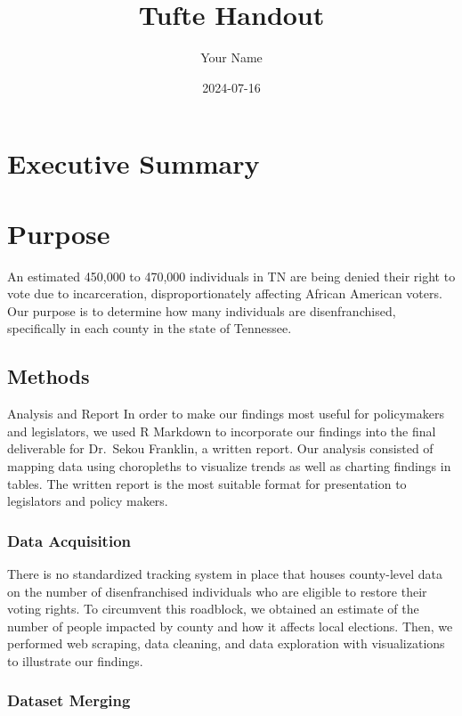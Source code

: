 \documentclass[12pt,]{tufte-handout}
\title{Tufte Handout}
\author{Your Name}
\date{2024-07-16}
\begin{document}
\maketitle




\section{Executive Summary}\label{executive-summary}

\section{Purpose}\label{purpose}

An estimated 450,000 to 470,000 individuals in TN are being denied their
right to vote due to incarceration, disproportionately affecting African
American voters. Our purpose is to determine how many individuals are
disenfranchised, specifically in each county in the state of Tennessee.

\subsection{Methods}\label{methods}

Analysis and Report In order to make our findings most useful for
policymakers and legislators, we used R Markdown to incorporate our
findings into the final deliverable for Dr.~Sekou Franklin, a written
report. Our analysis consisted of mapping data using choropleths to
visualize trends as well as charting findings in tables. The written
report is the most suitable format for presentation to legislators and
policy makers.

\subsubsection{Data Acquisition}\label{data-acquisition}

There is no standardized tracking system in place that houses
county-level data on the number of disenfranchised individuals who are
eligible to restore their voting rights. To circumvent this roadblock,
we obtained an estimate of the number of people impacted by county and
how it affects local elections. Then, we performed web scraping, data
cleaning, and data exploration with visualizations to illustrate our
findings.

\subsubsection{Dataset Merging}\label{dataset-merging}
\end{document}
